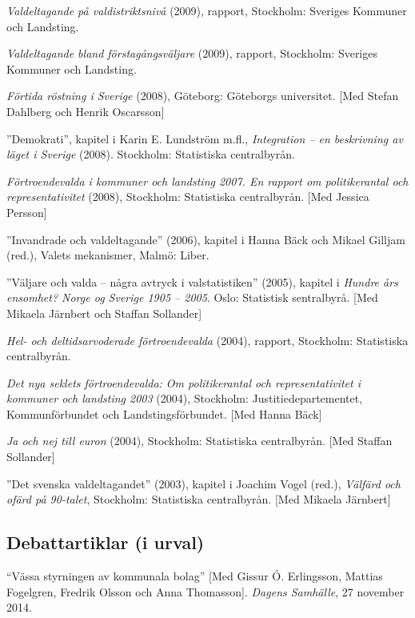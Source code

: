 \documentclass[11pt,]{article}
\begin{document}
\emph{Valdeltagande på valdistriktsnivå} (2009), rapport, Stockholm:
Sveriges Kommuner och Landsting.

\emph{Valdeltagande bland förstagångsväljare} (2009), rapport,
Stockholm: Sveriges Kommuner och Landsting.

\emph{Förtida röstning i Sverige} (2008), Göteborg: Göteborgs
universitet. {[}Med Stefan Dahlberg och Henrik Oscarsson{]}

''Demokrati'', kapitel i Karin E. Lundström m.fl., \emph{Integration --
en beskrivning av läget i Sverige} (2008). Stockholm: Statistiska
centralbyrån.

\emph{Förtroendevalda i kommuner och landsting 2007. En rapport om
politikerantal och representativitet} (2008), Stockholm: Statistiska
centralbyrån. {[}Med Jessica Persson{]}

''Invandrade och valdeltagande'' (2006), kapitel i Hanna Bäck och Mikael
Gilljam (red.), Valets mekanismer, Malmö: Liber.

''Väljare och valda -- några avtryck i valstatistiken'' (2005), kapitel
i \emph{Hundre års ensomhet? Norge og Sverige 1905 -- 2005}. Oslo:
Statistisk sentralbyrå. {[}Med Mikaela Järnbert och Staffan Sollander{]}

\emph{Hel- och deltidsarvoderade förtroendevalda} (2004), rapport,
Stockholm: Statistiska centralbyrån.

\emph{Det nya seklets förtroendevalda: Om politikerantal och
representativitet i kommuner och landsting 2003} (2004), Stockholm:
Justitiedepartementet, Kommunförbundet och Landstingsförbundet. {[}Med
Hanna Bäck{]}

\emph{Ja och nej till euron} (2004), Stockholm: Statistiska
centralbyrån. {[}Med Staffan Sollander{]}

''Det svenska valdeltagandet'' (2003), kapitel i Joachim Vogel (red.),
\emph{Välfärd och ofärd på 90-talet}, Stockholm: Statistiska
centralbyrån. {[}Med Mikaela Järnbert{]}

\hypertarget{debattartiklar-i-urval}{%
\subsection{\texorpdfstring{\textbf{Debattartiklar (i
urval)}}{Debattartiklar (i urval)}}\label{debattartiklar-i-urval}}

``Vässa styrningen av kommunala bolag'' {[}Med Gissur Ó. Erlingsson,
Mattias Fogelgren, Fredrik Olsson och Anna Thomasson{]}. \emph{Dagens
Samhälle}, 27 november 2014.
\end{document}
